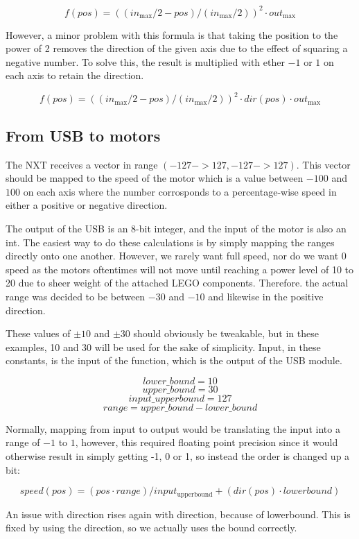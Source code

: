 $$
f(pos) = ((in_\text{max}/2 - pos)/(in_\text{max}/2))^2 \cdot out_\text{max}
$$

However, a minor problem with this formula is that taking the position to the power of 2 removes the direction of the given axis due to the effect of squaring a negative number.
To solve this, the result is multiplied with ether $-1$ or $1$ on each axis to retain the direction.

$$
f(pos) = ((in_\text{max}/2 - pos)/(in_\text{max}/2))^2 \cdot dir(pos) \cdot out_\text{max}
$$

\subsection{From USB to motors}
The NXT receives a vector in range $(-127 -> 127, -127 -> 127)$. 
This vector should be mapped to the speed of the motor which is a value between $-100$ and $100$ on each axis where the number corrosponds to a percentage-wise speed in either a positive or negative direction.

The output of the USB is an 8-bit integer, and the input of the motor is also an int.
The easiest way to do these calculations is by simply mapping the ranges directly onto one another.
However, we rarely want full speed, nor do we want 0 speed as the motors oftentimes will not move until reaching a power level of 10 to 20 due to sheer weight of the attached LEGO components.
Therefore. the actual range was decided to be between $-30$ and $-10$ and likewise in the positive direction.

These values of $\pm10$ and $\pm30$ should obviously be tweakable, but in these examples, 10 and 30 will be used for the sake of simplicity. 
Input, in these constants, is the input of the function, which is the output of the USB module.

	$$lower\_bound = 10$$
	$$upper\_bound = 30$$
	$$input\_upperbound = 127$$
	$$range = upper\_bound - lower\_bound$$

Normally, mapping from input to output would be translating the input into a range of $-1$ to $1$, however, this required floating point precision since it would otherwise result in simply getting -1, 0 or 1, so instead the order is changed up a bit:

$$
speed(pos) = (pos \cdot range)/input_\text{upperbound} + (dir(pos) \cdot lowerbound)
$$

An issue with direction rises again with direction, because of lowerbound.
This is fixed by using the direction, so we actually uses the bound correctly. 